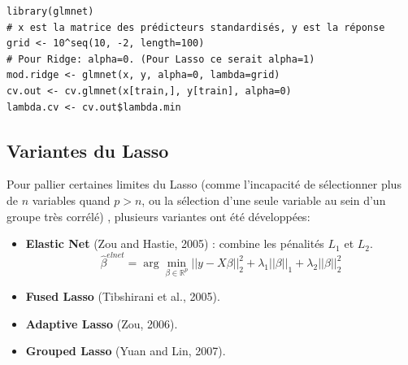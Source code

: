 \begin{verbatim}
library(glmnet)
# x est la matrice des prédicteurs standardisés, y est la réponse
grid <- 10^seq(10, -2, length=100)
# Pour Ridge: alpha=0. (Pour Lasso ce serait alpha=1)
mod.ridge <- glmnet(x, y, alpha=0, lambda=grid)
cv.out <- cv.glmnet(x[train,], y[train], alpha=0)
lambda.cv <- cv.out$lambda.min
\end{verbatim} 

\subsection{Variantes du Lasso}
Pour pallier certaines limites du Lasso (comme l'incapacité de sélectionner plus de $n$ variables quand $p > n$, ou la sélection d'une seule variable au sein d'un groupe très corrélé) , plusieurs variantes ont été développées:
\begin{itemize}
    \item \textbf{Elastic Net} (Zou and Hastie, 2005) : combine les pénalités $L_1$ et $L_2$.
    $$\hat{\beta}^{elnet} = \arg\min_{\beta \in \mathbb{R}^p} ||y - X\beta||_2^2 + \lambda_1||\beta||_1 + \lambda_2||\beta||_2^2$$ 
    \item \textbf{Fused Lasso} (Tibshirani et al., 2005).
    \item \textbf{Adaptive Lasso} (Zou, 2006).
    \item \textbf{Grouped Lasso} (Yuan and Lin, 2007).
\end{itemize}
